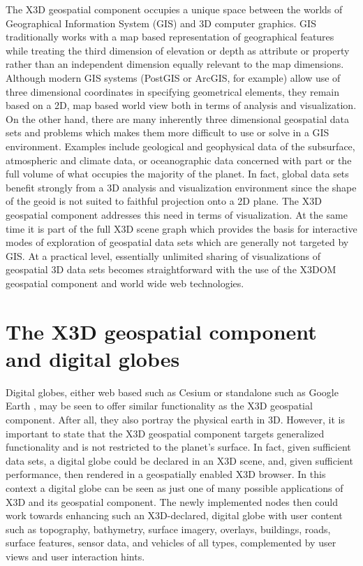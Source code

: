 \documentclass[review]{acmsiggraph}            %
\begin{document}
The X3D geospatial component occupies a unique space between the worlds of Geographical Information
System (GIS) and 3D computer graphics. GIS traditionally works with a map based representation of
geographical features while treating the third dimension of elevation or depth as attribute or
property rather than an independent dimension equally relevant to the map dimensions. Although
modern GIS systems (PostGIS or ArcGIS\texttrademark, for example) allow use of three dimensional coordinates in
specifying geometrical elements, they remain based on a 2D, map based world view both in terms of
analysis and visualization. On the other hand, there are many inherently three dimensional
geospatial data sets and problems which makes them more difficult to use or solve in a GIS
environment.  Examples include geological and geophysical data of the subsurface, atmospheric and
climate data, or oceanographic data concerned with part or the full volume of what occupies the
majority of the planet. In fact, global data sets benefit strongly from a 3D analysis and
visualization environment since the shape of the geoid is not suited to faithful projection onto a
2D plane. The X3D geospatial component addresses this need in terms of visualization. At the same
time it is part of the full X3D scene graph which provides the basis for interactive modes of
exploration of geospatial data sets which are generally not targeted by GIS. At a practical level,
essentially unlimited sharing of visualizations of geospatial 3D data sets becomes straightforward
with the use of the X3DOM geospatial component and world wide web technologies.


\section{The X3D geospatial component and digital globes}

Digital globes, either web based such as Cesium \cite{cesium15} or standalone such as Google Earth
\cite{googleearth15}, may be seen to offer similar functionality as the X3D geospatial component.
After all, they also portray the physical earth in 3D. However, it is important to state that the
X3D geospatial component targets generalized functionality and is not restricted to the planet's
surface. In fact, given sufficient data sets, a digital globe could be declared in an X3D scene,
and, given sufficient performance, then rendered in a geospatially enabled X3D browser. In this
context a digital globe can be seen as just one of many possible applications of X3D and its
geospatial component. The newly implemented nodes then could work towards enhancing such an
X3D-declared, digital globe with user content such as topography, bathymetry, surface imagery, 
overlays, buildings, roads, surface features, sensor data, and vehicles of all types, complemented
by user views and user interaction hints.
\end{document}

